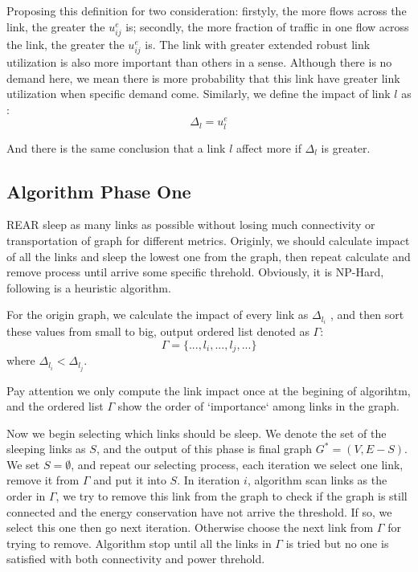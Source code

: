 \documentclass[conference]{IEEEtran}
\begin{document}
Proposing this definition for two consideration: firstyly, the more flows across the link, the greater the $u^e_{ij}$ is;
secondly, the more fraction of traffic in one flow across the link, the greater the $u^e_{ij}$ is. The link with greater
extended robust link utilization is also more important than others in a sense. Although there is no demand here, we mean
there is more probability that this link have greater link utilization when specific demand come. Similarly, we define 
the impact of link $l$ as :
\begin{equation}
    \Delta_l = u^e_{l}
\end{equation}

And there is the same conclusion that a link $l$ affect more if $\Delta_l$ is greater.


\subsection{Algorithm Phase One}
REAR sleep as many links as possible without losing much connectivity or transportation of graph for different metrics. 
Originly,  we should calculate impact of all the links and sleep the lowest one from the graph, then repeat calculate and remove
process until arrive some specific threhold. Obviously, it is NP-Hard, following is a heuristic algorithm.


For the origin graph, we calculate the impact of every link as $\Delta_{l_i}$ , and then sort these values
from small to big, output ordered list denoted as $\Gamma$: 
\begin{equation}
	\Gamma = \{..., l_i, ..., l_j, ...\}
\end{equation}
where $\Delta_{l_i} < \Delta_{l_j}$.


Pay attention we only compute the link impact once at the begining of algorihtm, and the ordered list $\Gamma$ show 
the order of `importance` among links in the graph. 


Now we begin selecting which links should be sleep.
We denote the set of the sleeping links as $S$, and the output of this phase is final graph $G^* = (V, E-S)$. We set 
$S = \emptyset$, and repeat our selecting process, each iteration we select one link, remove it from $\Gamma$ and put it into $S$. 
In iteration $i$, algorithm scan links as the order in $\Gamma$, we try to
remove this link from the graph to check if the graph is still connected and the energy conservation have not arrive the threshold.
If so, we select this one then go next iteration.
Otherwise choose the next link from $\Gamma$ for trying to remove. Algorithm
stop until all the links in $\Gamma$ is tried but no one is satisfied with both connectivity and power threhold.
\end{document}
